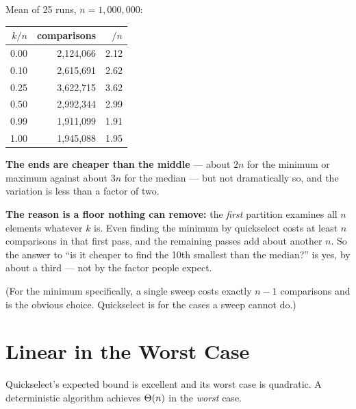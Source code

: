 \begin{worked}
Mean of 25 runs, $n = 1{,}000{,}000$:

\begin{center}
\begin{tabular}{@{}rrr@{}}
\toprule
\rowcolor{primary!15}
$k/n$ & comparisons & $/n$ \\
\midrule
0.00 & 2{,}124{,}066 & 2.12 \\
0.10 & 2{,}615{,}691 & 2.62 \\
0.25 & 3{,}622{,}715 & 3.62 \\
0.50 & 2{,}992{,}344 & 2.99 \\
0.99 & 1{,}911{,}099 & 1.91 \\
1.00 & 1{,}945{,}088 & 1.95 \\
\bottomrule
\end{tabular}
\end{center}

\smallskip
\textbf{The ends are cheaper than the middle} --- about $2n$ for the minimum or
maximum against about $3n$ for the median --- but not dramatically so, and the
variation is less than a factor of two.

\smallskip
\textbf{The reason is a floor nothing can remove:} the \emph{first} partition
examines all $n$ elements whatever $k$ is. Even finding the minimum by
quickselect costs at least $n$ comparisons in that first pass, and the
remaining passes add about another $n$. So the answer to ``is it cheaper to
find the 10th smallest than the median?'' is yes, by about a third --- not by
the factor people expect.

\smallskip
(For the minimum specifically, a single sweep costs exactly $n-1$ comparisons
and is the obvious choice. Quickselect is for the cases a sweep cannot do.)
\end{worked}

\section{Linear in the Worst Case}

Quickselect's expected bound is excellent and its worst case is quadratic. A
deterministic algorithm achieves $\Theta(n)$ in the \emph{worst} case.

